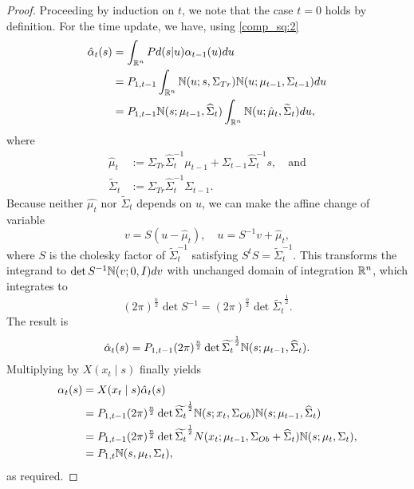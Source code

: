 \documentclass[12pt,leqno]{article}
\begin{document}
\begin{proof}

Proceeding by induction on $t$, we note that the case $t = 0$ holds by definition.
For the time update, we have, using \eqref{comp_sq:2}
\begin{align}
  \hat{\alpha}_t(s) &= \int_{{\mathbb R}^n}Pd(s|u)\alpha_{t-1}(u)du \\\notag
  &= P_{1,t-1}\int_{{\mathbb R}^n}{\mathbb N}(u;s,\Sigma_{Tr}){\mathbb N}(u;\mu_{t-1},\Sigma_{t-1})du \notag\\
  &= P_{1,t-1}{\mathbb N}(s;\mu_{t-1},\widehat{\Sigma}_t)\int_{{\mathbb R}^n}{\mathbb N}(u;\hat{\mu}_t,
  \widetilde{\Sigma}_t) du,
\end{align}
where
 \begin{align*}
  \hat{\mu}_t &:= \Sigma_{Tr}\widehat{\Sigma}_t^{-1}\mu_{t-1} +
  \Sigma_{t-1}\widehat{\Sigma}_t^{-1}s, \quad\text{and}\\
  \widetilde{\Sigma}_t &:= \Sigma_{Tr}\widehat{\Sigma}_t^{-1}\Sigma_{t-1}.
  \end{align*}
Because neither $\hat{\mu_t}$ nor $\widetilde{\Sigma}_t$ depends on $u$, we can
make the affine change of variable
$$
v = S(u-\hat{\mu}_t),\quad u = S^{-1}v+\hat{\mu}_t,
$$
where $S$ is the cholesky factor of $\widetilde{\Sigma}_t^{-1}$ satisfying
$S^tS = \widetilde{\Sigma}_t^{-1}$. This transforms the integrand to
  $\det{S}^{-1}{\mathbb N}(v;0,I)dv$
with unchanged domain of integration ${\mathbb R}^n$, which integrates to
$$
(2\pi)^{\frac{n}{2}}\det{S}^{-1} = (2\pi)^{\frac{n}{2}}\det{\widetilde{\Sigma_t}}^{\frac{1}{2}}.
$$
The result is
$$
\hat{\alpha}_t(s) = P_{1,t-1}(2\pi)^{\frac{n}{2}}\det{\widetilde{\Sigma_t}}^{\frac{1}{2}}
{\mathbb N}(s;\mu_{t-1},\widehat{\Sigma}_t).
$$
Multiplying by $X(x_t\mid s)$ finally yields
\begin{align*}
  \alpha_t(s) &= X(x_t\mid s)\hat{\alpha}_t(s) \\
  &= P_{1,t-1}(2\pi)^{\frac{n}{2}}\det{\widetilde{\Sigma_t}}^{\frac{1}{2}}
  {\mathbb N}(s;x_t,\Sigma_{Ob}){\mathbb N}(s;\mu_{t-1},\widehat{\Sigma}_t) \\
  &= P_{1,t-1}(2\pi)^{\frac{n}{2}}\det{\widetilde{\Sigma_t}}^{\frac{1}{2}}
  N(x_t;\mu_{t-1},\Sigma_{Ob} + \widehat{\Sigma}_t){\mathbb N}(s;\mu_t,\Sigma_t), \\
  &= P_{1,t}{\mathbb N}(s,\mu_t,\Sigma_t),
\end{align*}
as required.
\end{proof}
\end{document}
